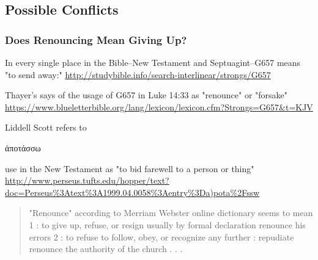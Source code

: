 \documentclass[11pt]{article}
\begin{document}
\subsection{Possible Conflicts}
\subsubsection{Does Renouncing Mean Giving Up?}
In every single place in the Bible--New Testament and Septuagint--G657 means "to send away:"
\url{http://studybible.info/search-interlinear/strongs/G657}

Thayer's says of the usage of G657 in Luke 14:33 as "renounce" or "forsake"
\url{https://www.blueletterbible.org/lang/lexicon/lexicon.cfm?Strongs=G657&t=KJV}

Liddell Scott refers to \begin{greek} ἀποτάσσω \end{greek} use in the New Testament as "to bid farewell to a person or thing"
\url{http://www.perseus.tufts.edu/hopper/text?doc=Perseus\%3Atext\%3A1999.04.0058\%3Aentry\%3Da)pota\%2Fssw}
\begin{quote}
"Renounce" according to Merriam Webster online dictionary seems to mean 
1
:  to give up, refuse, or resign usually by formal declaration renounce his errors
2
:  to refuse to follow, obey, or recognize any further :  repudiate renounce the authority of the church
. . .
\cite{renounce}
\end{quote}
\end{document}
